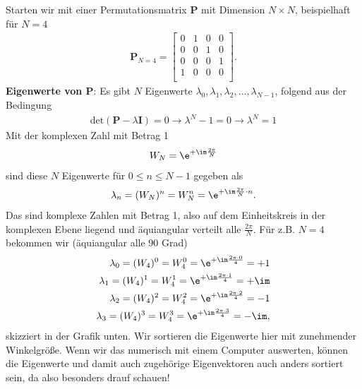 Starten wir mit einer Permutationsmatrix $\bm{P}$ mit Dimension $N \times N$,
beispielhaft für $N=4$
\begin{align}
\bm{P}_{N=4} =
\begin{bmatrix}
0 & 1 & 0 & 0\\
0 & 0 & 1 & 0\\
0 & 0 & 0 & 1\\
1 & 0 & 0 & 0\\
\end{bmatrix}.
\end{align}
%
\textbf{Eigenwerte von $\bm{P}$}:
Es gibt $N$ Eigenwerte $\lambda_{0}, \lambda_{1}, \lambda_{2}, \dots, \lambda_{N-1}$,
folgend aus der Bedingung
\begin{align}
\mathrm{det}(\bm{P}-\lambda \bm{I}) = 0 \rightarrow \lambda^N - 1 = 0 \rightarrow \lambda^N = 1
\end{align}
%
Mit der komplexen Zahl mit Betrag 1
\begin{align}
W_N = \e^{+\im\frac{2\pi}{N}}
\end{align}
sind diese $N$ Eigenwerte für $0\leq n \leq N-1$ gegeben als
\begin{align}
\lambda_n =(W_N)^n = W_N^n = \e^{+\im\frac{2\pi}{N}\cdot n}.
\end{align}
Das sind komplexe Zahlen mit Betrag 1, also auf dem Einheitskreis in der komplexen
Ebene liegend und äquiangular verteilt alle $\frac{2\pi}{N}$.
%
Für z.B. $N=4$ bekommen wir (äquiangular alle 90 Grad)
\begin{align}
\lambda_0 =(W_4)^0 = W_4^0 = \e^{+\im\frac{2\pi\cdot 0}{4}} = +1\nonumber\\
\lambda_1 =(W_4)^1 = W_4^1 = \e^{+\im\frac{2\pi\cdot 1}{4}} = +\im\nonumber\\
\lambda_2 =(W_4)^2 = W_4^2 = \e^{+\im\frac{2\pi\cdot 2}{4}} = -1\nonumber\\
\lambda_3 =(W_4)^3 = W_4^3 = \e^{+\im\frac{2\pi\cdot 3}{4}} = -\im,
\end{align}
skizziert in der Grafik unten. Wir sortieren die Eigenwerte hier mit
zunehmender Winkelgröße. Wenn wir das numerisch mit einem Computer auswerten,
können die Eigenwerte und damit auch zugehörige Eigenvektoren auch anders sortiert sein,
da also besonders drauf schauen!
\begin{center}
\end{center}



